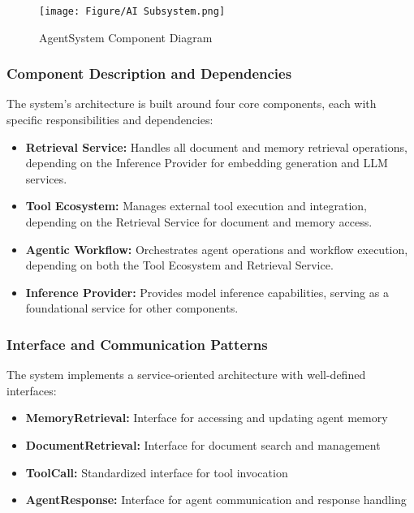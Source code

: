 \documentclass[../Main.tex]{subfiles}
\begin{document}
	\begin{figure}[H]
		\centering
		\texttt{[image: Figure/AI Subsystem.png]}
		\caption{AgentSystem Component Diagram}
		\label{fig:AgentSystem_Component_Diagram}
	\end{figure}

	\subsubsection{Component Description and Dependencies}
	\label{section:4.1.2.1_component_description_and_dependencies} The system's
	architecture is built around four core components, each with specific responsibilities
	and dependencies:

	\begin{itemize}
		\item \textbf{Retrieval Service:} Handles all document and memory retrieval
			operations, depending on the Inference Provider for embedding generation and
			LLM services.

		\item \textbf{Tool Ecosystem:} Manages external tool execution and
			integration, depending on the Retrieval Service for document and memory access.

		\item \textbf{Agentic Workflow:} Orchestrates agent operations and workflow
			execution, depending on both the Tool Ecosystem and Retrieval Service.

		\item \textbf{Inference Provider:} Provides model inference capabilities, serving
			as a foundational service for other components.
	\end{itemize}

	\subsubsection{Interface and Communication Patterns}
	\label{section:4.1.2.2_interface_and_communication_patterns} The system
	implements a service-oriented architecture with well-defined interfaces:

	\begin{itemize}
		\item \textbf{MemoryRetrieval:} Interface for accessing and updating agent
			memory

		\item \textbf{DocumentRetrieval:} Interface for document search and
			management

		\item \textbf{ToolCall:} Standardized interface for tool invocation

		\item \textbf{AgentResponse:} Interface for agent communication and response
			handling
	\end{itemize}
\end{document}
